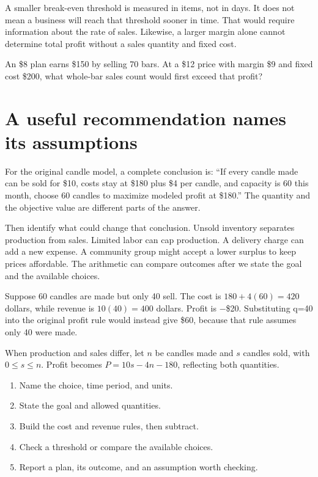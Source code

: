 \documentclass[11pt,letterpaper]{article}
\begin{document}
A smaller break-even threshold is measured in items, not in days. It does not mean a business will reach that threshold sooner in time. That would require information about the rate of sales. Likewise, a larger margin alone cannot determine total profit without a sales quantity and fixed cost.



\begin{tcolorbox}[title={Pause and try 9},breakable]
An \$8 plan earns \$150 by selling 70 bars. At a \$12 price with margin \$9 and fixed cost \$200, what whole-bar sales count would first exceed that profit?
\end{tcolorbox}

\clearpage

\section{A useful recommendation names its assumptions}

For the original candle model, a complete conclusion is: ``If every candle made can be sold for \$10, costs stay at \$180 plus \$4 per candle, and capacity is 60 this month, choose 60 candles to maximize modeled profit at \$180.'' The quantity and the objective value are different parts of the answer.


Then identify what could change that conclusion. Unsold inventory separates production from sales. Limited labor can cap production. A delivery charge can add a new expense. A community group might accept a lower surplus to keep prices affordable. The arithmetic can compare outcomes after we state the goal and the available choices.


\begin{tcolorbox}[title={Example \textperiodcentered{} When production and sales are different},breakable]

Suppose 60 candles are made but only 40 sell. The cost is \(180+4(60)=420\) dollars, while revenue is \(10(40)=400\) dollars. Profit is $-$\$20. Substituting q=40 into the original profit rule would instead give \$60, because that rule assumes only 40 were made.


When production and sales differ, let \(n\) be candles made and \(s\) candles sold, with \(0\le s\le n\). Profit becomes \(P=10s-4n-180\), reflecting both quantities.


\end{tcolorbox}

\begin{enumerate}
\item Name the choice, time period, and units.
\item State the goal and allowed quantities.
\item Build the cost and revenue rules, then subtract.
\item Check a threshold or compare the available choices.
\item Report a plan, its outcome, and an assumption worth checking.

\end{enumerate}
\end{document}
